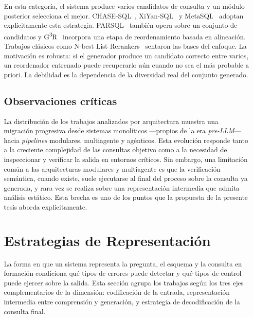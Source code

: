 En esta categoría, el sistema produce varios candidatos de consulta y un
módulo posterior selecciona el mejor. CHASE-SQL~\cite{CHASE-SQL2025},
XiYan-SQL~\cite{XiYan-SQL2024} y MetaSQL~\cite{MetaSQL2024} adoptan
explícitamente esta estrategia. PARSQL~\cite{PARSQL2025} también opera
sobre un conjunto de candidatos y G\textsuperscript{3}R~\cite{G3R2023}
incorpora una etapa de reordenamiento basada en alineación. Trabajos
clásicos como N-best List Rerankers~\cite{N-bestListRerankers2022} sentaron
las bases del enfoque. La motivación es robusta: si el generador produce un
candidato correcto entre varios, un reordenador entrenado puede
recuperarlo aún cuando no sea el más probable a priori. La debilidad es la
dependencia de la diversidad real del conjunto generado.

\subsection{Observaciones críticas}
\label{subsec:sota-d2-obs}

La distribución de los trabajos analizados por arquitectura muestra una
migración progresiva desde sistemas monolíticos ---propios de la era
\emph{pre-LLM}--- hacia \emph{pipelines} modulares, multiagente y
agénticos. Esta evolución responde tanto a la creciente complejidad de las
consultas objetivo como a la necesidad de inspeccionar y verificar la
salida en entornos críticos. Sin embargo, una limitación común a las
arquitecturas modulares y multiagente es que la verificación semántica,
cuando existe, suele ejecutarse al final del proceso sobre la consulta ya
generada, y rara vez se realiza sobre una representación intermedia que
admita análisis estático. Esta brecha es uno de los puntos que la
propuesta de la presente tesis aborda explícitamente.

\section{Estrategias de Representación}
\label{sec:sota-d3-representacion}

La forma en que un sistema representa la pregunta, el esquema y la
consulta en formación condiciona qué tipos de errores puede detectar y
qué tipos de control puede ejercer sobre la salida. Esta sección agrupa
los trabajos según los tres ejes complementarios de la dimensión:
codificación de la entrada, representación intermedia entre comprensión y
generación, y estrategia de decodificación de la consulta final.

